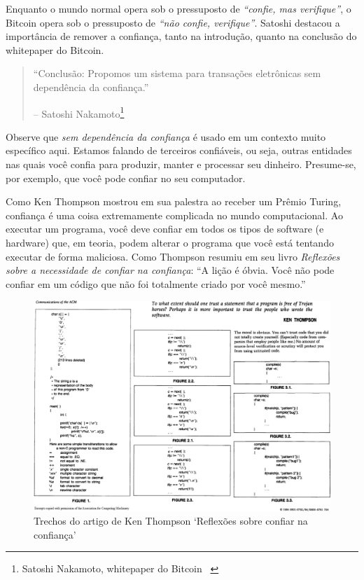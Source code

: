 Enquanto o mundo normal opera sob o pressuposto de \textit{\enquote {confie, mas verifique}}, o Bitcoin opera sob o pressuposto de \textit{\enquote{não confie, verifique}}. Satoshi destacou a importância de remover a confiança, tanto na introdução, quanto na conclusão do whitepaper do Bitcoin.

\begin{quotation}\begin{samepage} 
\enquote{Conclusão: Propomos um sistema para transações eletrônicas sem dependência da confiança.}
\begin{flushright} -- Satoshi Nakamoto\footnote{Satoshi Nakamoto, whitepaper do Bitcoin ~\cite{whitepaper}}
\end{flushright}\end{samepage}\end{quotation}

Observe que \textit{sem dependência da confiança} é usado em um contexto muito específico aqui. Estamos falando de terceiros confiáveis, ou seja, outras entidades nas quais você confia para produzir, manter e processar seu dinheiro. Presume-se, por exemplo, que você pode confiar no seu computador.

Como Ken Thompson mostrou em sua palestra ao receber um Prêmio Turing, confiança é uma coisa extremamente complicada no mundo computacional. Ao executar um programa, você deve confiar em todos os tipos de software (e hardware) que, em teoria, podem alterar o programa que você está tentando executar de forma maliciosa. Como Thompson resumiu em seu livro \textit{Reflexões sobre a necessidade de confiar na confiança}: \enquote{A lição é óbvia. Você não pode confiar em um código que não foi totalmente criado por você mesmo.}~\cite{trusting-trust}

\begin{figure}
  \includegraphics{assets/images/ken-thompson-hack.png}
  \caption{Trechos do artigo de Ken Thompson `Reflexões sobre confiar na confiança'}
  \label{fig:ken-thompson-hack}
\end{figure}

